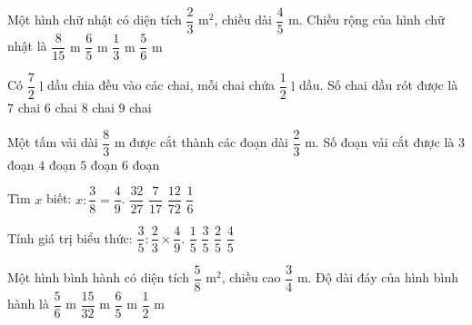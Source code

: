 \begin{ex} %
Một hình chữ nhật có diện tích $\dfrac{2}{3}\text{ m}^2$, chiều dài $\dfrac{4}{5}\text{ m}$. Chiều rộng của hình chữ nhật là
\choice
{$\dfrac{8}{15}\text{ m}$}
{$\dfrac{6}{5}\text{ m}$}
{$\dfrac{1}{3}\text{ m}$}
{\True $\dfrac{5}{6}\text{ m}$}
\end{ex}

\begin{ex} %
Có $\dfrac{7}{2}\text{ l}$ dầu chia đều vào các chai, mỗi chai chứa $\dfrac{1}{2}\text{ l}$ dầu. Số chai dầu rót được là
\choice
{\True $7$ chai}
{$6$ chai}
{$8$ chai}
{$9$ chai}
\end{ex}

\begin{ex} %
Một tấm vải dài $\dfrac{8}{3}\text{ m}$ được cắt thành các đoạn dài $\dfrac{2}{3}\text{ m}$. Số đoạn vải cắt được là
\choice
{$3$ đoạn}
{\True $4$ đoạn}
{$5$ đoạn}
{$6$ đoạn}
\end{ex}

\begin{ex} %
Tìm $x$ biết: $x : \dfrac{3}{8} = \dfrac{4}{9}$.
\choice
{$\dfrac{32}{27}$}
{$\dfrac{7}{17}$}
{$\dfrac{12}{72}$}
{\True $\dfrac{1}{6}$}
\end{ex}

\begin{ex} %
Tính giá trị biểu thức: $\dfrac{3}{5} : \dfrac{2}{3} \times \dfrac{4}{9}$.
\choice
{$\dfrac{1}{5}$}
{$\dfrac{3}{5}$}
{\True $\dfrac{2}{5}$}
{$\dfrac{4}{5}$}
\end{ex}

\begin{ex} %
Một hình bình hành có diện tích $\dfrac{5}{8}\text{ m}^2$, chiều cao $\dfrac{3}{4}\text{ m}$. Độ dài đáy của hình bình hành là
\choice
{\True $\dfrac{5}{6}\text{ m}$}
{$\dfrac{15}{32}\text{ m}$}
{$\dfrac{6}{5}\text{ m}$}
{$\dfrac{1}{2}\text{ m}$}
\end{ex}

